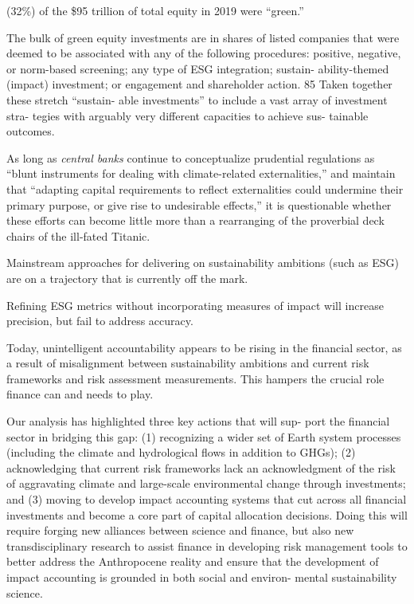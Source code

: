 \documentclass[
]{book}
\begin{document}
(32\%) of the \$95 trillion of total equity in 2019 were ``green.''

The bulk of green equity investments are in shares of
listed companies that were deemed to be associated with
any of the following procedures: positive, negative, or
norm-based screening; any type of ESG integration; sustain-
ability-themed (impact) investment; or engagement and
shareholder action. 85 Taken together these stretch ``sustain-
able investments'' to include a vast array of investment stra-
tegies with arguably very different capacities to achieve sus-
tainable outcomes.

As long as \emph{central banks} continue to
conceptualize prudential regulations as ``blunt instruments for
dealing with climate-related externalities,'' and maintain that
``adapting capital requirements to reflect externalities could
undermine their primary purpose, or give rise to undesirable
effects,'' it is questionable whether these efforts can become
little more than a rearranging of the proverbial deck chairs of
the ill-fated Titanic.

Mainstream approaches for delivering on sustainability ambitions (such as
ESG) are on a trajectory that is currently off the mark.

Refining ESG metrics without incorporating measures of impact
will increase precision, but fail to address accuracy.

Today, unintelligent
accountability appears to be rising in the financial sector, as a
result of misalignment between sustainability ambitions and current
risk frameworks and risk assessment measurements. This
hampers the crucial role finance can and needs to play.

Our analysis has highlighted three key actions that will sup-
port the financial sector in bridging this gap: (1) recognizing a
wider set of Earth system processes (including the climate
and hydrological flows in addition to GHGs); (2) acknowledging
that current risk frameworks lack an acknowledgment of the
risk of aggravating climate and large-scale environmental
change through investments; and (3) moving to develop impact
accounting systems that cut across all financial investments
and become a core part of capital allocation decisions. Doing
this will require forging new alliances between science and
finance, but also new transdisciplinary research to assist
finance in developing risk management tools to better address
the Anthropocene reality and ensure that the development of
impact accounting is grounded in both social and environ-
mental sustainability science.
\end{document}
